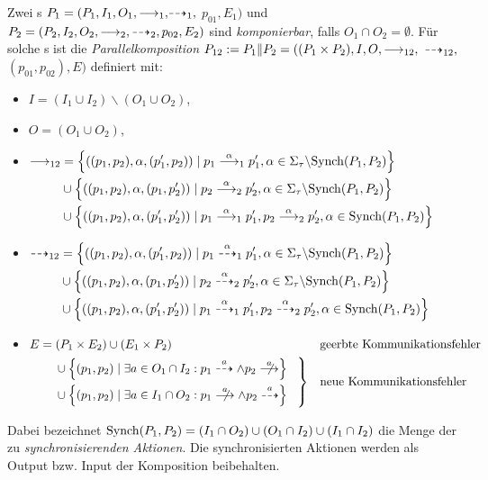 \begin{Def}[Parallelkomposition]
  Zwei \MEIO{}s $P_1 = (P_1,I_1,O_1,{\must_1,}{\may_1,}$ $p_{01},E_1)$ und $P_2 =
  (P_2,I_2,O_2,\must_2,\may_2,p_{02},E_2)$ sind \emph{komponierbar}, falls
  $O_1\cap O_2=\emptyset$. Für solche \MEIO{}s ist die
  \emph{Parallelkomposition} $P_{12} := P_1\|P_2=((P_1\times P_2), I, O,
  {\must_{12},}$ ${\may_{12},}$ $(p_{01}, p_{02}), E)$ definiert mit:
  \begin{itemize}
    \item $I=(I_1\cup I_2)\backslash (O_1\cup O_2)$,
    \item $O=(O_1\cup O_2)$,
  \item $\begin{aligned}[t]
      \must_{12} & = \left\{\left((p_1,p_2),\alpha,(p_1',p_2)\right) \mid p_1
      \must[\alpha]_1 p_1', \alpha\in\Sigma_{\tau}\backslash
      \Synch(P_1,P_2)\right\}\\
        &\cup \left\{\left((p_1,p_2),\alpha,(p_1,p_2')\right) \mid p_2
      \must[\alpha]_2 p_2', \alpha\in\Sigma_{\tau}\backslash
      \Synch(P_1,P_2)\right\}\\
        &\cup \left\{\left((p_1,p_2),\alpha,(p_1',p_2')\right) \mid p_1
      \must[\alpha]_1 p_1', p_2 \must[\alpha]_2 p_2', \alpha\in
      \Synch(P_1,P_2)\right\}
    \end{aligned}$
  \item $\begin{aligned}[t]
      \may_{12} & = \left\{\left((p_1,p_2),\alpha,(p_1',p_2)\right) \mid p_1
      \may[\alpha]_1 p_1', \alpha\in\Sigma_{\tau}\backslash
      \Synch(P_1,P_2)\right\}\\
        &\cup \left\{\left((p_1,p_2),\alpha,(p_1,p_2')\right) \mid p_2
      \may[\alpha]_2 p_2', \alpha\in\Sigma_{\tau}\backslash
      \Synch(P_1,P_2)\right\}\\
        &\cup \left\{\left((p_1,p_2),\alpha,(p_1',p_2')\right) \mid p_1
      \may[\alpha]_1 p_1', p_2 \may[\alpha]_2 p_2', \alpha\in
      \Synch(P_1,P_2)\right\}
    \end{aligned}$
  \item $\begin{aligned}[t]
      E & = (P_1\times E_2) \cup (E_1\times P_2) &&\text{geerbte
      Kommunikationsfehler}\\
        &\quad\left. \begin{aligned}
        &\cup \left\{(p_1,p_2) \mid \exists a \in O_1\cap I_2 : p_1
        \may[a]\land p_2\nmust[a]\right\}\\
        &\cup \left\{(p_1,p_2) \mid \exists a\in I_1\cap O_2 :
        p_1\nmust[a]\land p_2\may[a]\right\}
        \end{aligned}\hspace{0.3cm}\right\} &&\text{neue Kommunikationsfehler}
    \end{aligned}$
  \end{itemize}
  Dabei bezeichnet $\mathrm{Synch}(P_1,P_2)=(I_1\cap O_2)\cup (O_1\cap I_2)\cup
  (I_1\cap I_2)$ die Menge der zu \emph{synchronisierenden Aktionen}. Die
  synchronisierten Aktionen werden als Output bzw. Input der Komposition
  beibehalten.
\end{Def}

